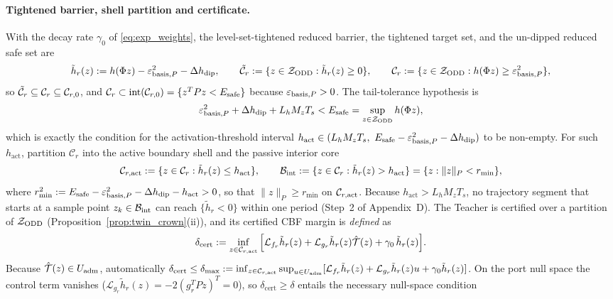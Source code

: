 \paragraph{Tightened barrier, shell partition and certificate.}
With the decay rate \(\gamma_0\) of \eqref{eq:exp_weights}, the level-set-tightened reduced barrier, the tightened target set, and the un-dipped reduced safe set are
\begin{equation}
\label{eq:h_tilde_def}
\tilde{h}_r(z) := h(\Phi z) - \varepsilon_{\mathrm{basis},P}^2 - \Delta h_{\mathrm{dip}}, \qquad
\tilde{\mathcal{C}}_r := \{z \in \mathcal{Z}_{\mathrm{ODD}} : \tilde{h}_r(z) \ge 0\}, \qquad
\mathcal{C}_r := \{z \in \mathcal{Z}_{\mathrm{ODD}} : h(\Phi z) \ge \varepsilon_{\mathrm{basis},P}^2\},
\end{equation}
so \(\tilde{\mathcal{C}}_r \subseteq \mathcal{C}_r \subseteq \mathcal{C}_{r,0}\), and \(\mathcal{C}_r \subset \mathrm{int}(\mathcal{C}_{r,0}) = \{z^TPz < E_{\mathrm{safe}}\}\) because \(\varepsilon_{\mathrm{basis},P} > 0\). The tail-tolerance hypothesis is
\begin{equation}
\label{eq:eps_basis_def}
\varepsilon_{\mathrm{basis},P}^2 + \Delta h_{\mathrm{dip}} + L_h M_z T_s < E_{\mathrm{safe}} = \sup_{z \in \mathcal{Z}_{\mathrm{ODD}}} h(\Phi z),
\end{equation}
which is exactly the condition for the activation-threshold interval \(h_{\mathrm{act}} \in (L_hM_zT_s,\ E_{\mathrm{safe}} - \varepsilon_{\mathrm{basis},P}^2 - \Delta h_{\mathrm{dip}})\) to be non-empty. For such \(h_{\mathrm{act}}\), partition \(\mathcal{C}_r\) into the active boundary shell and the passive interior core
\begin{equation}
\label{eq:shell}
\mathcal{C}_{r,\mathrm{act}} := \{z \in \mathcal{C}_r : \tilde{h}_r(z) \le h_{\mathrm{act}}\}, \qquad
\mathcal{B}_{\mathrm{int}} := \{z \in \mathcal{C}_r : \tilde{h}_r(z) > h_{\mathrm{act}}\} = \{z : \|z\|_P < r_{\min}\},
\end{equation}
where \(r_{\min}^2 := E_{\mathrm{safe}} - \varepsilon_{\mathrm{basis},P}^2 - \Delta h_{\mathrm{dip}} - h_{\mathrm{act}} > 0\), so that \(\|z\|_P \ge r_{\min}\) on \(\mathcal{C}_{r,\mathrm{act}}\). Because \(h_{\mathrm{act}} > L_hM_zT_s\), no trajectory segment that starts at a sample point \(z_k \in \mathcal{B}_{\mathrm{int}}\) can reach \(\{\tilde h_r < 0\}\) within one period (Step~2 of Appendix~D). The Teacher is certified over a partition of \(\mathcal{Z}_{\mathrm{ODD}}\) (Proposition~\ref{prop:twin_crown}(ii)), and its certified CBF margin is \emph{defined} as
\begin{equation}
\label{eq:teacher_cbf}
\delta_{\mathrm{cert}} := \inf_{z \in \mathcal{C}_{r,\mathrm{act}}} \Big[ \mathcal{L}_{f_r}\tilde{h}_r(z) + \mathcal{L}_{g_r}\tilde{h}_r(z)\hat{\mathcal{T}}(z) + \gamma_0\,\tilde{h}_r(z) \Big].
\end{equation}
Because \(\hat{\mathcal{T}}(z) \in U_{\mathrm{adm}}\), automatically \(\delta_{\mathrm{cert}} \le \delta_{\max} := \inf_{z \in \mathcal{C}_{r,\mathrm{act}}}\sup_{u \in U_{\mathrm{adm}}}[\mathcal{L}_{f_r}\tilde{h}_r(z) + \mathcal{L}_{g_r}\tilde{h}_r(z)u + \gamma_0\tilde{h}_r(z)]\). On the port null space the control term vanishes (\(\mathcal{L}_{g_r}\tilde h_r(z) = -2(g_r^TPz)^T = 0\)), so \(\delta_{\mathrm{cert}} \ge \delta\) entails the necessary null-space condition
